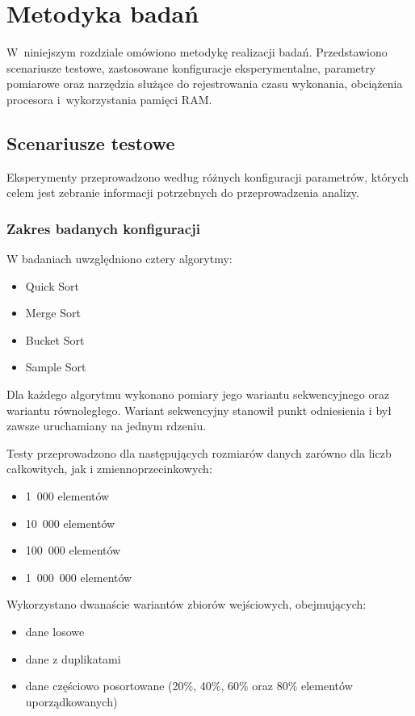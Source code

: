 \cleardoublepage
\chapter{Metodyka badań}
\label{cha:MetodykaBadan}

W~niniejszym rozdziale omówiono metodykę realizacji badań. 
Przedstawiono scenariusze testowe, zastosowane konfiguracje eksperymentalne, 
parametry pomiarowe oraz narzędzia służące do rejestrowania czasu wykonania, obciążenia procesora i~wykorzystania pamięci RAM.

\section{Scenariusze testowe}
\label{sec:ScenariuszeTestowe}

Eksperymenty przeprowadzono według różnych konfiguracji parametrów, których celem jest zebranie informacji potrzebnych do przeprowadzenia analizy.

\subsection*{Zakres badanych konfiguracji}

W badaniach uwzględniono cztery algorytmy:
\begin{itemize}
    \item Quick Sort
    \item Merge Sort
    \item Bucket Sort
    \item Sample Sort
\end{itemize}

Dla każdego algorytmu wykonano pomiary jego wariantu sekwencyjnego oraz wariantu równoległego. 
Wariant sekwencyjny stanowił punkt odniesienia i był zawsze uruchamiany na jednym rdzeniu.

Testy przeprowadzono dla następujących rozmiarów danych zarówno dla liczb całkowitych, jak i zmiennoprzecinkowych:
\begin{itemize}
    \item 1~000 elementów
    \item 10~000 elementów
    \item 100~000 elementów
    \item 1~000~000 elementów
\end{itemize}

Wykorzystano dwanaście wariantów zbiorów wejściowych, obejmujących:
\begin{itemize}
    \item dane losowe
    \item dane z duplikatami
    \item dane częściowo posortowane (20\%, 40\%, 60\% oraz 80\% elementów uporządkowanych)
\end{itemize}

